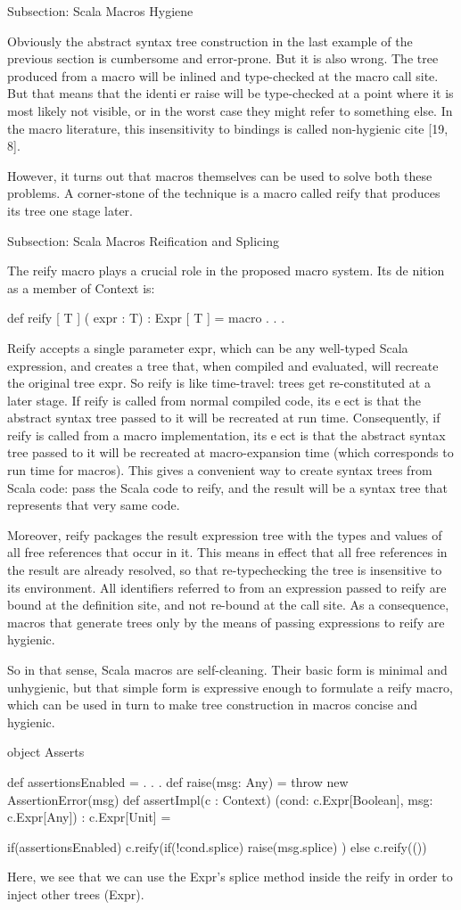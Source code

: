 Subsection: Scala Macros Hygiene

Obviously the abstract syntax tree construction in the last example of the
previous section is cumbersome and error-prone. But it is also wrong. The tree
produced from a macro will be inlined and type-checked at the macro call site.
But that means that the identier raise will be type-checked at a point where it
is most likely not visible, or in the worst case they might refer to something
else. In the macro literature, this insensitivity to bindings is called
non-hygienic {cite [19, 8]}.

However, it turns out that macros themselves can be used to solve both these
problems. A corner-stone of the technique is a macro called reify that produces
its tree one stage later.


Subsection: Scala Macros Reification and Splicing

The reify macro plays a crucial role in the proposed macro system. Its de
nition as a member of Context is:

def reify [ T ] ( expr : T) : Expr [ T ] = macro . . .

Reify accepts a single parameter expr, which can be any well-typed Scala
expression, and creates a tree that, when compiled and evaluated, will recreate
the original tree expr. So reify is like time-travel: trees get re-constituted
at a later stage. If reify is called from normal compiled code, its eect is
that the abstract syntax tree passed to it will be recreated at run time.
Consequently, if reify is called from a macro implementation, its eect is that
the abstract syntax tree passed to it will be recreated at macro-expansion time
(which corresponds to run time for macros). This gives a convenient way to
create syntax trees from Scala code: pass the Scala code to reify, and the
result will be a syntax tree that represents that very same code.

Moreover, reify packages the result expression tree with the types and values of
all free references that occur in it. This means in effect that all
free references in the result are already resolved, so that re-typechecking the
tree is insensitive to its environment. All identifiers referred to from
an expression passed to reify are bound at the definition site, and not re-bound
at the call site. As a consequence, macros that generate trees only by the means
of passing expressions to reify are hygienic.

So in that sense, Scala macros are self-cleaning. Their basic form is minimal
and unhygienic, but that simple form is expressive enough to formulate a
reify macro, which can be used in turn to make tree construction in
macros concise and hygienic.

object Asserts {
  def assertionsEnabled = . . .
  def raise(msg: Any) = throw new AssertionError(msg)
  def assertImpl(c : Context)
    (cond: c.Expr[Boolean], msg: c.Expr[Any])
    : c.Expr[Unit] = 
    
    if(assertionsEnabled)
      c.reify(if(!cond.splice) raise(msg.splice) )
    else
      c.reify(())
}

Here, we see that we can use the Expr's splice method inside the reify in order
to inject other trees (Expr).